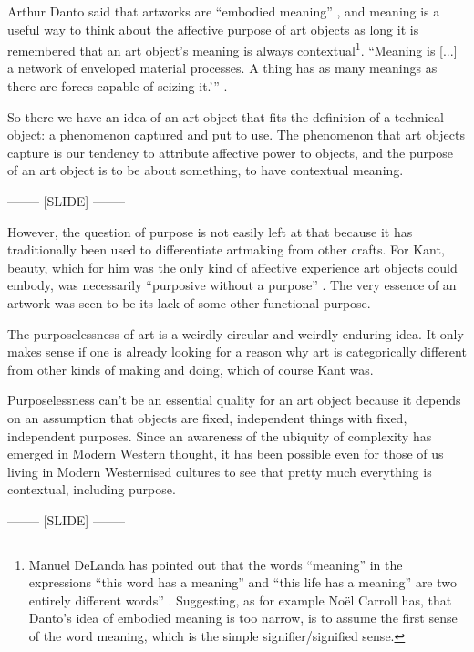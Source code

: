 \documentclass[letter:wpaper]{article}
\begin{document}
    Arthur Danto said that artworks are ``embodied meaning'' \citep[p.125]{DantoEmbdMnngs2007}, and meaning is a useful way to think about the affective purpose of art objects as long it is remembered that an art object's meaning is always contextual\footnote{
        Manuel DeLanda has pointed out that the words ``meaning'' in the expressions ``this word has a meaning'' and ``this life has a meaning'' are two entirely different words'' \citep[pp.40–41]{DeLandaCsltyAndMnng2018}. Suggesting, as for example Noël Carroll has, that Danto's idea of embodied meaning is too narrow, is to assume the first sense of the word meaning, which is the simple signifier/signified sense.
    }. ``Meaning is [...] a network of enveloped material processes. A thing has as many meanings as there are forces capable of seizing it.’'' \citep[p.10]{MassumiAUsrsGdTCptlsmAndSchzphrn1992}.

    So there we have an idea of an art object that fits the definition of a technical object: a phenomenon captured and put to use. The phenomenon that art objects capture is our tendency to attribute affective power to objects, and the purpose of an art object is to be about something, to have contextual meaning.

-------- [SLIDE] --------

    However, the question of purpose is not easily left at that because it has traditionally been used to differentiate artmaking from other crafts. For Kant, beauty, which for him was the only kind of affective experience art objects could embody, was necessarily ``purposive without a purpose'' \citep[p.57]{KantCrtqOfJdgmnt}. The very essence of an artwork was seen to be its lack of some other functional purpose.
    
    The purposelessness of art is a weirdly circular and weirdly enduring idea. It only makes sense if one is already looking for a reason why art is categorically different from other kinds of making and doing, which of course Kant was.
    
    Purposelessness can't be an essential quality for an art object because it depends on an assumption that objects are fixed, independent things with fixed, independent purposes. Since an awareness of the ubiquity of complexity has emerged in Modern Western thought, it has been possible even for those of us living in Modern Westernised cultures to see that pretty much everything is contextual, including purpose.

-------- [SLIDE] --------
\end{document}
